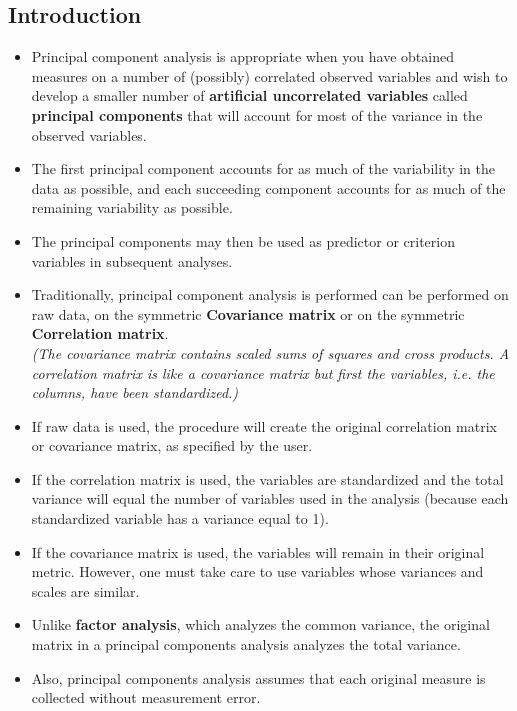 \documentclass[]{article}
\begin{document}
\subsection{Introduction}
\begin{itemize}
\item Principal component analysis is appropriate when you have obtained measures on a number of
(possibly) correlated observed variables and wish to develop a smaller number of \textbf{artificial uncorrelated variables} called \textbf{principal components} that will account for most of the variance in the observed variables. 

\item The first principal component accounts for as much of the variability in the data as possible, and each succeeding component accounts for as much of the remaining variability as possible. \item The principal
components may then be used as predictor or criterion variables in subsequent analyses.


\item Traditionally, principal component analysis is performed can be performed on raw data, on the symmetric \textbf{Covariance matrix} or on the symmetric \textbf{Correlation matrix}.\\\textit{ (The covariance matrix contains scaled sums of squares and cross products. A correlation matrix is like a covariance matrix but first the variables, i.e. the columns, have been standardized.)
}
\item If raw data is used, the procedure will create the original correlation matrix or covariance matrix, as specified by the user.  
\item If the correlation matrix is used, the variables are standardized and the total variance will equal the number of variables used in the analysis (because each standardized variable has a variance equal to 1).  

\item If the covariance matrix is used, the variables will remain in their original metric.  However, one must take care to use variables whose variances and scales are similar.  

\item Unlike \textbf{factor analysis}, which analyzes the common variance, the original matrix in a principal components analysis analyzes the total variance. 
\item Also, principal components analysis assumes that each original measure is collected without measurement error.
\end{itemize}
\newpage
\end{document}
